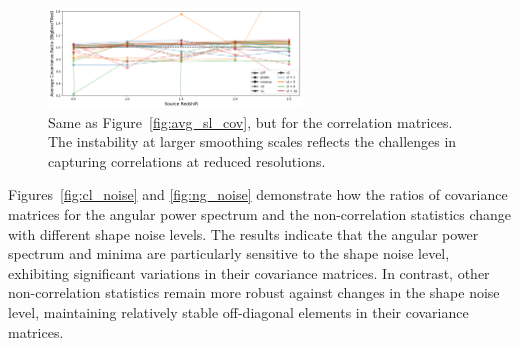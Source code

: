 \begin{figure}
    \label{fig:avg_sl_cov}
    \vspace{0.5cm}
    \includegraphics[width=0.6\textwidth]{figures/results/avg_corr_ratio_sl.png}
    \caption{Same as Figure~\ref{fig:avg_sl_cov}, but for the correlation matrices. The instability at larger smoothing scales reflects the challenges in capturing correlations at reduced resolutions.}
    \label{fig:avg_sl_corr}
\end{figure}

Figures~\ref{fig:cl_noise} and \ref{fig:ng_noise} demonstrate how the ratios of covariance matrices for the angular power spectrum and the non-correlation statistics change with different shape noise levels. The results indicate that the angular power spectrum and minima are particularly sensitive to the shape noise level, exhibiting significant variations in their covariance matrices. In contrast, other non-correlation statistics remain more robust against changes in the shape noise level, maintaining relatively stable off-diagonal elements in their covariance matrices.

